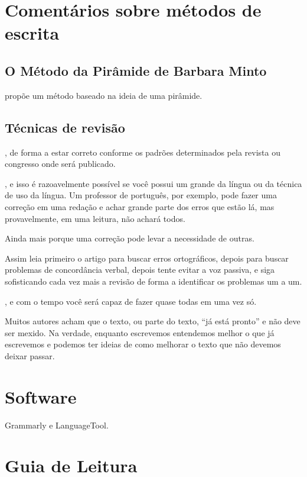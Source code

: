 \documentclass[openany]{book}
\begin{document}
\chapter{Comentários sobre métodos de escrita}

\section{O Método da Pirâmide de Barbara Minto}

\citet{minto2009pyramid} propõe um método baseado na ideia de uma pirâmide.


\section{Técnicas de revisão}

, de forma a estar correto conforme os padrões determinados pela revista ou congresso onde será publicado.

, e isso é razoavelmente possível se você possui um grande da língua ou da técnica de uso da língua. Um professor de português, por exemplo, pode fazer uma correção em uma redação e achar grande parte dos erros que estão lá, mas provavelmente, em uma leitura, não achará todos.

 Ainda mais porque uma correção pode levar a necessidade de outras.

 Assim leia primeiro o artigo para buscar erros ortográficos, depois para buscar problemas de concordância verbal, depois tente evitar a voz passiva, e siga sofisticando cada vez mais a revisão de forma a identificar os problemas um a um.

, e com o tempo você será capaz de fazer quase todas em uma vez só.


 Muitos autores acham que o texto, ou parte do texto, ``já está pronto'' e não deve ser mexido. Na verdade, enquanto escrevemos entendemos melhor o que já escrevemos e podemos ter ideias de como melhorar o texto que não devemos deixar passar.

\chapter{Software}
\label{sec:software}
Grammarly e LanguageTool.

\chapter{Guia de Leitura}


\backmatter

\printbibliography

\newpage

\listofsubjects
\end{document}
